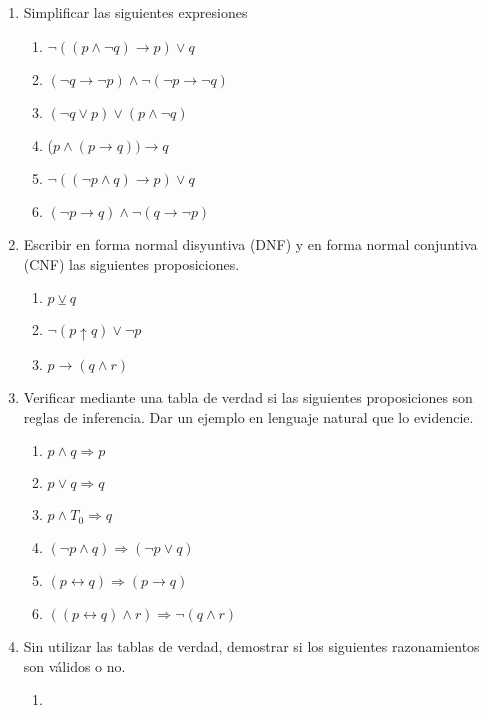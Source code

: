 \documentclass[a4paper]{article}
\newcommand{\exercise}{\item}
\newcommand{\then}{\to}
\newcommand{\eq}{\leftrightarrow}
\newcommand{\xor}{\veebar}
\newcommand{\nand}{\uparrow}
\newcommand{\Then}{\Rightarrow}
\begin{document}
\begin{enumerate}
	\exercise Simplificar las siguientes expresiones
	\begin{multicols}{2}
	\begin{enumerate} [label=(\alph*)]
		\item $\neg ((p \land \neg q)\then p) \lor q$
		\item $(\neg q \then \neg p) \land \neg (\neg p \then \neg q)$
		\item $(\neg q \lor p) \lor (p \land \neg q)$
		\item ($p \land ( p \then q)) \then q$
		\item $\neg ((\neg p \land q) \then p) \lor q$
		\item $(\neg p \then q) \land \neg (q \then \neg p)$
	\end{enumerate}
	\end{multicols}
	\exercise Escribir en forma normal disyuntiva (DNF) y en forma normal conjuntiva (CNF) las siguientes proposiciones.
	\begin{multicols}{2}
	\begin{enumerate} [label=(\alph*)]
		\item $p\xor q$
		\item $\neg (p \nand q) \lor \neg p$
		\item $p\then  (q\land r)$
	\end{enumerate}
	\end{multicols}
	\exercise Verificar mediante una tabla de verdad si las siguientes proposiciones son reglas de inferencia. Dar un ejemplo en lenguaje natural que lo evidencie.
	\begin{multicols}{2}
	\begin{enumerate} [label=(\alph*)]
		\item $p \land q \Then p$
		\item $p\lor q \Then  q$
		\item $p \land  T_0 \Then  q$
		\item $(\neg p \land q) \Then (\neg p \lor q)$
		\item $(p\eq q) \Then  (p\then q)$
		\item $((p \eq q) \land r ) \Then \neg (q \land r)$
	\end{enumerate}
	\end{multicols}
	\exercise Sin utilizar las tablas de verdad, demostrar si los siguientes razonamientos son válidos o no. 
	\begin{multicols}{3}
	\begin{enumerate} [label=(\alph*)]
		\item \Reasoning{$\neg p\then p$}{$p$}

\end{enumerate}
\end{multicols}
\end{enumerate}
\end{document}
